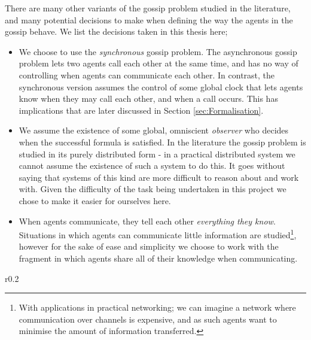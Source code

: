 \documentclass[10pt, a4paper]{report}
\begin{document}
There are many other variants of the gossip problem studied in the literature,
and many potential decisions to make when defining the way the agents in the
gossip behave. We list the decisions taken in this thesis here;

\begin{itemize}
  \item We choose to use the \emph{synchronous} gossip problem. The asynchronous
    gossip problem lets two agents call each other at the same time, and has no
    way of controlling when agents can communicate each other. In contrast, the
    synchronous version assumes the control of some global clock that lets
    agents know when they may call each other, and when a call occurs. This has
    implications that are later discussed in Section \ref{sec:Formalisation}.
  \item We assume the existence of some global, omniscient \emph{observer} who
    decides when the successful formula is satisfied. In the literature the
    gossip problem is studied in its purely distributed form - in a practical
    distributed system we cannot assume the existence of such a system to do
    this. It goes without saying that systems of this kind are more difficult to
    reason about and work with. Given the difficulty of the task being
    undertaken in this project we chose to make it easier for ourselves here.
  \item When agents communicate, they tell each other \emph{everything they
      know}. Situations in which agents can communicate little information are
    studied\footnote{With applications in practical networking; we can imagine a
    network where communication over channels is expensive, and as such agents
    want to minimise the amount of information transferred.}, however for the
  sake of ease and simplicity we choose to work with the fragment in which
  agents share all of their knowledge when communicating. 
\end{itemize}

\begin{wrapfigure}{r}{0.2\textwidth}
  \centering
  \caption{}
  \label{fig:abacda}
\end{wrapfigure}
\end{document}
